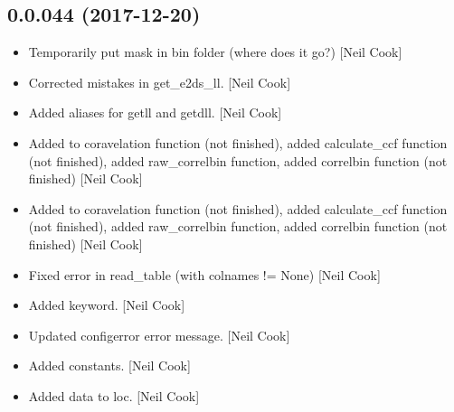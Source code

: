 \documentclass[a4paper,10pt,english]{report}
\begin{document}
\subsection{0.0.044 (2017-12-20)}
\label{\detokenize{misc/changelog:id506}}\begin{itemize}
\item {} 
Temporarily put mask in bin folder (where does it go?) {[}Neil Cook{]}

\item {} 
Corrected mistakes in get\_e2ds\_ll. {[}Neil Cook{]}

\item {} 
Added aliases for getll and getdll. {[}Neil Cook{]}

\item {} 
Added to coravelation function (not finished), added calculate\_ccf
function (not finished), added raw\_correlbin function, added correlbin
function (not finished) {[}Neil Cook{]}

\item {} 
Added to coravelation function (not finished), added calculate\_ccf
function (not finished), added raw\_correlbin function, added correlbin
function (not finished) {[}Neil Cook{]}

\item {} 
Fixed error in read\_table (with colnames != None) {[}Neil Cook{]}

\item {} 
Added keyword. {[}Neil Cook{]}

\item {} 
Updated configerror error message. {[}Neil Cook{]}

\item {} 
Added constants. {[}Neil Cook{]}

\item {} 
Added data to loc. {[}Neil Cook{]}

\end{itemize}
\end{document}

